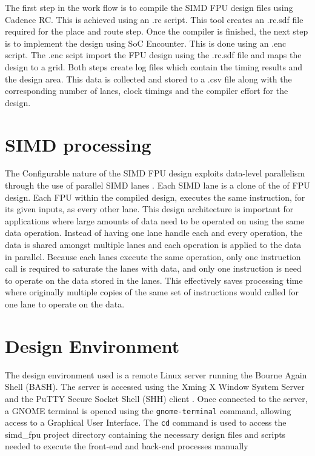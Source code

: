 \documentclass[conference]{IEEEtran}
\begin{document}
The first step in the work flow is to compile the SIMD FPU design files using Cadence RC. This is achieved using an .rc script. This tool creates an .rc.sdf file required for the place and route step. Once the compiler is finished, the next step is to implement the design using SoC Encounter. This is done using an .enc script. The .enc scipt import the FPU design using the .rc.sdf file and maps the design to a grid. Both steps create log files which contain the timing results and the design area. This data is collected and stored to a .csv file along with the corresponding number of lanes, clock timings and the compiler effort for the design.

\section{SIMD processing}

The Configurable nature of the SIMD FPU design exploits data-level parallelism through the use of parallel SIMD lanes \cite{SIMD}. Each SIMD lane is a clone of the of FPU design. Each FPU within the compiled design, executes the same instruction, for its given inputs, as every other lane. This design architecture is important for applications where large amounts of data need to be operated on using the same data operation. Instead of having one lane handle each and every operation, the data is shared amongst multiple lanes and each operation is applied to the data in parallel. Because each lanes execute the same operation, only one instruction call is required to saturate the lanes with data, and only one instruction is need to operate on the data stored in the lanes. This effectively saves processing time where originally multiple copies of the same set of instructions would called for one lane to operate on the data. 
\newline
\section{Design Environment}

The design environment used is a remote Linux server running the Bourne Again Shell (BASH). The server is accessed using the Xming X Window System Server \cite{xming} and the PuTTY Secure Socket Shell (SHH) client \cite{putty}. Once connected to the server, a GNOME terminal is opened using the \texttt{gnome-terminal} command, allowing access to a Graphical User Interface. The \texttt{cd} command is used to access the simd\_fpu project directory containing the necessary design files and scripts needed to execute the front-end and back-end processes manually
\newline
\end{document}
